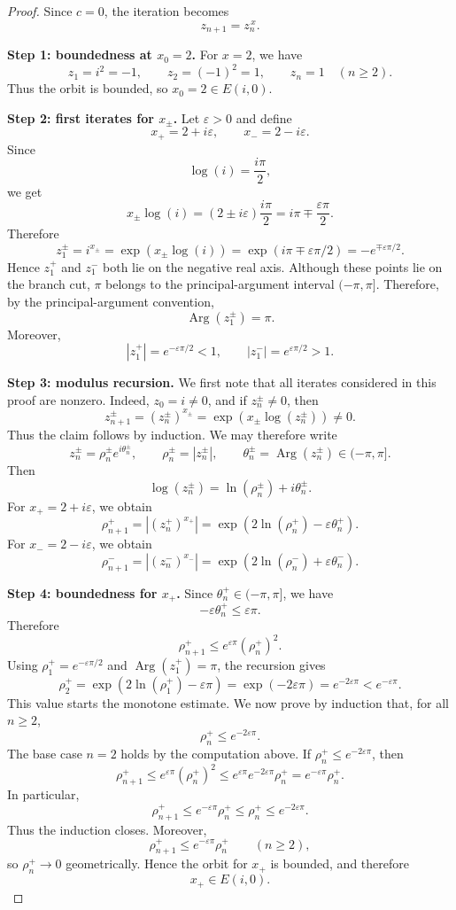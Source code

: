 \documentclass[12pt,a4paper]{amsart}
\theoremstyle{remark}
\begin{document}
\begin{proof}
Since $c=0$, the iteration becomes
\[
z_{n+1}=z_n^{\,x}.
\]

\smallskip
\noindent\textbf{Step 1: boundedness at $x_0=2$.}
For $x=2$, we have
\[
z_1=i^2=-1,\qquad z_2=(-1)^2=1,\qquad z_n=1\quad(n\ge 2).
\]
Thus the orbit is bounded, so $x_0=2\in E(i,0)$.

\smallskip
\noindent\textbf{Step 2: first iterates for $x_\pm$.}
Let $\varepsilon>0$ and define
\[
x_+=2+i\varepsilon,\qquad x_-=2-i\varepsilon.
\]
Since
\[
\log(i)=\frac{i\pi}{2},
\]
we get
\[
x_\pm\log(i)
=(2\pm i\varepsilon)\frac{i\pi}{2}
=i\pi\mp\frac{\varepsilon\pi}{2}.
\]
Therefore
\[
z_1^\pm=i^{x_\pm}
=\exp(x_\pm\log(i))
=\exp(i\pi\mp\varepsilon\pi/2)
=-e^{\mp\varepsilon\pi/2}.
\]
Hence $z_1^+$ and $z_1^-$ both lie on the negative real axis. Although these
points lie on the branch cut, $\pi$ belongs to the principal-argument interval
$(-\pi,\pi]$. Therefore, by the principal-argument convention,
\[
\operatorname{Arg}(z_1^\pm)=\pi.
\]
Moreover,
\[
|z_1^+|=e^{-\varepsilon\pi/2}<1,
\qquad
|z_1^-|=e^{\varepsilon\pi/2}>1.
\]

\smallskip
\noindent\textbf{Step 3: modulus recursion.}
We first note that all iterates considered in this proof are nonzero. Indeed,
$z_0=i\ne 0$, and if $z_n^\pm\ne 0$, then
\[
z_{n+1}^\pm=(z_n^\pm)^{x_\pm}=\exp(x_\pm\log(z_n^\pm))\ne 0.
\]
Thus the claim follows by induction. We may therefore write
\[
z_n^\pm=\rho_n^\pm e^{i\theta_n^\pm},
\qquad
\rho_n^\pm=|z_n^\pm|,
\qquad
\theta_n^\pm=\operatorname{Arg}(z_n^\pm)\in(-\pi,\pi].
\]
Then
\[
\log(z_n^\pm)=\ln(\rho_n^\pm)+i\theta_n^\pm.
\]
For $x_+=2+i\varepsilon$, we obtain
\[
\rho_{n+1}^+
=|(z_n^+)^{x_+}|
=\exp(2\ln(\rho_n^+)-\varepsilon\theta_n^+).
\]
For $x_-=2-i\varepsilon$, we obtain
\[
\rho_{n+1}^-
=|(z_n^-)^{x_-}|
=\exp(2\ln(\rho_n^-)+\varepsilon\theta_n^-).
\]

\smallskip
\noindent\textbf{Step 4: boundedness for $x_+$.}
Since $\theta_n^+\in(-\pi,\pi]$, we have
\[
-\varepsilon\theta_n^+\le \varepsilon\pi.
\]
Therefore
\[
\rho_{n+1}^+
\le
e^{\varepsilon\pi}(\rho_n^+)^2.
\]
Using $\rho_1^+=e^{-\varepsilon\pi/2}$ and $\operatorname{Arg}(z_1^+)=\pi$, the recursion
gives
\[
\rho_2^+
=\exp(2\ln(\rho_1^+)-\varepsilon\pi)
=\exp(-2\varepsilon\pi)
=e^{-2\varepsilon\pi}
<e^{-\varepsilon\pi}.
\]
This value starts the monotone estimate. We now prove by induction that, for
all $n\ge 2$,
\[
\rho_n^+\le e^{-2\varepsilon\pi}.
\]
The base case $n=2$ holds by the computation above. If
$\rho_n^+\le e^{-2\varepsilon\pi}$, then
\[
\rho_{n+1}^+
\le e^{\varepsilon\pi}(\rho_n^+)^2
\le e^{\varepsilon\pi}e^{-2\varepsilon\pi}\rho_n^+
=e^{-\varepsilon\pi}\rho_n^+.
\]
In particular,
\[
\rho_{n+1}^+\le e^{-\varepsilon\pi}\rho_n^+\le \rho_n^+
\le e^{-2\varepsilon\pi}.
\]
Thus the induction closes. Moreover,
\[
\rho_{n+1}^+\le e^{-\varepsilon\pi}\rho_n^+
\qquad(n\ge 2),
\]
so $\rho_n^+\to 0$ geometrically. Hence the orbit for $x_+$ is bounded, and
therefore
\[
x_+\in E(i,0).
\]


\end{proof}
\end{document}
